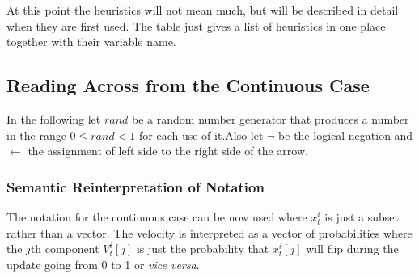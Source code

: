 \documentclass[a4paper,oneside,english]{book}
\numberwithin{equation}{section}
\numberwithin{figure}{section}
\begin{document}
At this point the heuristics will not mean much, but will be described  in detail when they are first used. The table just gives a list of heuristics in one place together with their variable name.  



\subsection{Reading Across from the Continuous Case}
In the following let $rand$ be a random number generator that produces a number in the range $0\leq rand < 1$ for each use of it.Also let $\neg$ be the logical negation and $\leftarrow$ the assignment of left side to the right side of the arrow.

\subsubsection{Semantic Reinterpretation of Notation }
The notation for the continuous case can be now used where $x_t^i$ is just a subset rather than a vector. The velocity is interpreted as a vector of probabilities  where the $j$th component $V_t^i[j]$ is just the probability that $x_t^i[j]$ will flip during the update going from 0 to 1 or \textit{vice versa}.
\end{document}
